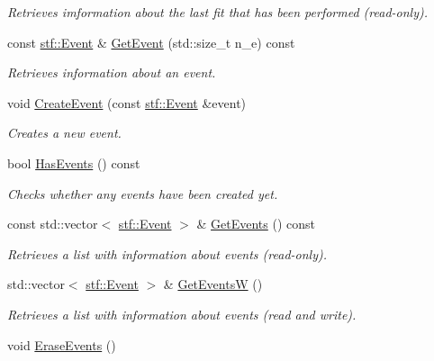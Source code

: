 \begin{DoxyCompactItemize}
\begin{DoxyCompactList}\small\item\em Retrieves imformation about the last fit that has been performed (read-\/only). \item\end{DoxyCompactList}\item 
const \hyperlink{classstf_1_1Event}{stf::Event} \& \hyperlink{classSection_ad048175b4fcce50838ab5604f435b1f9}{GetEvent} (std::size\_\-t n\_\-e) const 
\begin{DoxyCompactList}\small\item\em Retrieves information about an event. \item\end{DoxyCompactList}\item 
void \hyperlink{classSection_aabad035dd62df6b845bca4138c0685ed}{CreateEvent} (const \hyperlink{classstf_1_1Event}{stf::Event} \&event)
\begin{DoxyCompactList}\small\item\em Creates a new event. \item\end{DoxyCompactList}\item 
bool \hyperlink{classSection_ae9305686a770854b262d8aa75d3398cf}{HasEvents} () const 
\begin{DoxyCompactList}\small\item\em Checks whether any events have been created yet. \item\end{DoxyCompactList}\item 
const std::vector$<$ \hyperlink{classstf_1_1Event}{stf::Event} $>$ \& \hyperlink{classSection_ab1e4f735f699678dca948360fc8f8b51}{GetEvents} () const 
\begin{DoxyCompactList}\small\item\em Retrieves a list with information about events (read-\/only). \item\end{DoxyCompactList}\item 
std::vector$<$ \hyperlink{classstf_1_1Event}{stf::Event} $>$ \& \hyperlink{classSection_a46a0af45a6c08ee391efae80dcd8b663}{GetEventsW} ()
\begin{DoxyCompactList}\small\item\em Retrieves a list with information about events (read and write). \item\end{DoxyCompactList}\item 
\hypertarget{classSection_a7bf02bc096fa3a159cf9e48ac53b48d0}{
void \hyperlink{classSection_a7bf02bc096fa3a159cf9e48ac53b48d0}{EraseEvents} ()}
\label{classSection_a7bf02bc096fa3a159cf9e48ac53b48d0}


\end{DoxyCompactItemize}
